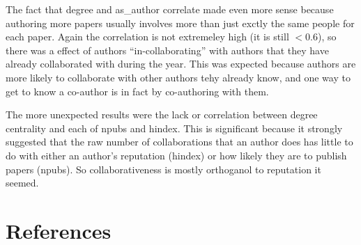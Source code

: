 \documentclass{article}
\begin{document}
The fact that degree and as\_author correlate made even more sense because authoring more papers usually involves more than just exctly the same people for each paper.
Again the correlation is not extremeley high (it is still $< 0.6$), so there was a effect of authors ``in-collaborating'' with authors that they have already collaborated with during the year.
This was expected because authors are more likely to collaborate with other authors tehy already know, and one way to get to know a co-author is in fact by co-authoring with them.

The more unexpected results were the lack or correlation between degree centrality and each of npubs and hindex.
This is significant because it strongly suggested that the raw number of collaborations that an author does has little to do with either an author's reputation (hindex) or how likely they are to publish papers (npubs).
So collaborativeness is mostly orthoganol to reputation it seemed.



\section*{References}
\end{document}
